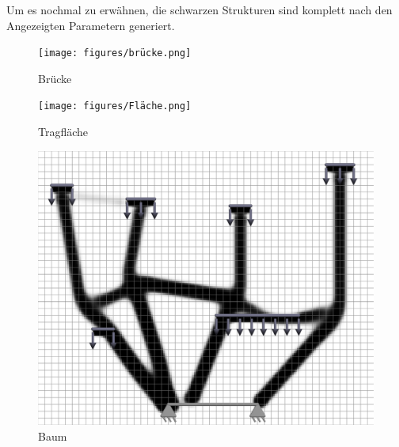 \documentclass{article}
\begin{document}
Um es nochmal zu erw\"ahnen, die schwarzen Strukturen sind komplett nach den Angezeigten 
Parametern generiert.

\begin{figure}[H]
    \begin{minipage}{0.25\textwidth}
        \centering
        \texttt{[image: figures/brücke.png]}
        \caption{Br\"ucke}
        \label{fig:bruecke}
    \end{minipage}\hfill
    \begin{minipage}{0.25\textwidth}
        \centering
        \texttt{[image: figures/Fläche.png]}
        \caption{Tragfl\"ache}
    \end{minipage}\hfill
    \begin{minipage}{0.25\textwidth}
        \centering
        \includegraphics[width=\linewidth]{figures/baum.png}
        \caption{Baum}
    \end{minipage}
\end{figure}
\end{document}

